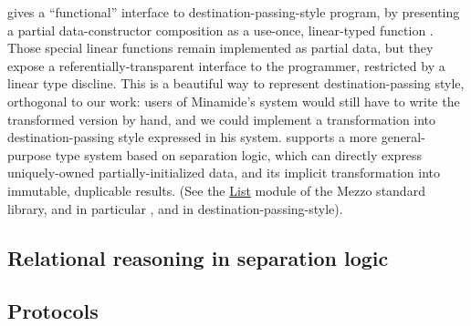 \cite*{minamide-98} gives a ``functional'' interface to
destination-passing-style program, by presenting a partial
data-constructor composition  as a use-once,
linear-typed function . Those special
linear functions remain implemented as partial data, but they expose
a referentially-transparent interface to the programmer, restricted by
a linear type discline. This is a beautiful way to represent
destination-passing style, orthogonal to our work: users of Minamide's
system would still have to write the transformed version by hand, and
we could implement a transformation into destination-passing style
expressed in his system. \citet*{mezzo-2016}
supports a more general-purpose type system based on separation logic,
which can directly express uniquely-owned partially-initialized data,
and its implicit transformation into immutable, duplicable
results. (See the
\href{https://protz.github.io/mezzo/code_samples/list.mz.html}{List}
module of the Mezzo standard library, and in particular ,
 and  in destination-passing-style).


\subsection{Relational reasoning in separation logic}


\subsection{Protocols}



